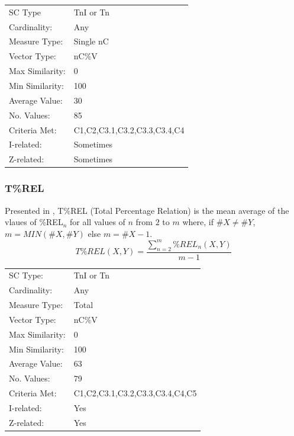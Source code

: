 \documentclass{article}
\begin{document}
\begin{center}
\begin{tabular}{ll}
 SC Type          &  TnI or Tn                     \\
 Cardinality:     &  Any                           \\
 Measure Type:    &  Single nC                     \\
 Vector Type:     &  nC\%V                         \\
 Max Similarity:  &  0                             \\
 Min Similarity:  &  100                           \\
 Average Value:   &  30                            \\
 No. Values:      &  85                            \\
 Criteria Met:    &  C1,C2,C3.1,C3.2,C3.3,C3.4,C4  \\
 I-related:       &  Sometimes                     \\
 Z-related:       &  Sometimes                     \\
\end{tabular}
\end{center}
\subsubsection{T\%REL}
\label{sec-13-8-4}

Presented in \citet{Castren1994}, T\%REL (Total Percentage Relation) is
the mean average of the vlaues of \%REL$_{n}$ for all values of $n$ from $2$
to $m$ where, if $\#X\neq\#Y$, $m = MIN(\#X,\#Y)$ else $m=\#X-1$.
$$T\%REL(X,Y)=\frac{\sum_{n=2}^{m}{\%REL_n\left(X,Y\right)}}{m-1}$$

\begin{center}
\begin{tabular}{ll}
 SC Type:         &  TnI or Tn                        \\
 Cardinality:     &  Any                              \\
 Measure Type:    &  Total                            \\
 Vector Type:     &  nC\%V                            \\
 Max Similarity:  &  0                                \\
 Min Similarity:  &  100                              \\
 Average Value:   &  63                               \\
 No. Values:      &  79                               \\
 Criteria Met:    &  C1,C2,C3.1,C3.2,C3.3,C3.4,C4,C5  \\
 I-related:       &  Yes                              \\
 Z-related:       &  Yes                              \\
\end{tabular}
\end{center}
\end{document}
